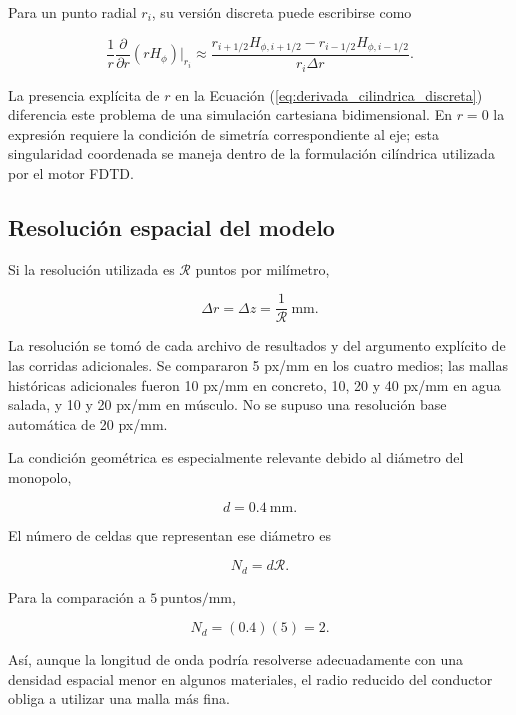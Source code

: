 Para un punto radial $r_i$, su versión discreta puede escribirse como

\begin{equation}
\frac{1}{r}
\frac{\partial}{\partial r}(rH_\phi)
\Bigg|_{r_i}
\approx
\frac{
r_{i+1/2}H_{\phi,i+1/2}
-
r_{i-1/2}H_{\phi,i-1/2}
}{
r_i\Delta r
}.
\label{eq:derivada_cilindrica_discreta}
\end{equation}

La presencia explícita de $r$ en la Ecuación (\ref{eq:derivada_cilindrica_discreta}) diferencia este problema de una simulación cartesiana bidimensional. En $r=0$ la expresión requiere la condición de simetría correspondiente al eje; esta singularidad coordenada se maneja dentro de la formulación cilíndrica utilizada por el motor FDTD.

\subsection{Resolución espacial del modelo}

Si la resolución utilizada es $\mathcal{R}$ puntos por milímetro,

\begin{equation}
\Delta r=\Delta z=\frac{1}{\mathcal{R}}~\mathrm{mm}.
\end{equation}

La resolución se tomó de cada archivo de resultados y del argumento explícito de las corridas adicionales. Se compararon 5 px/mm en los cuatro medios; las mallas históricas adicionales fueron 10 px/mm en concreto, 10, 20 y 40 px/mm en agua salada, y 10 y 20 px/mm en músculo. No se supuso una resolución base automática de 20 px/mm.

La condición geométrica es especialmente relevante debido al diámetro del monopolo,

\begin{equation}
d=0.4~\mathrm{mm}.
\end{equation}

El número de celdas que representan ese diámetro es

\begin{equation}
N_d
=
d\mathcal{R}.
\end{equation}

Para la comparación a $5~\mathrm{puntos/mm}$,

\begin{equation}
N_d
=
(0.4)(5)
=
2.
\end{equation}

Así, aunque la longitud de onda podría resolverse adecuadamente con una densidad espacial menor en algunos materiales, el radio reducido del conductor obliga a utilizar una malla más fina.


